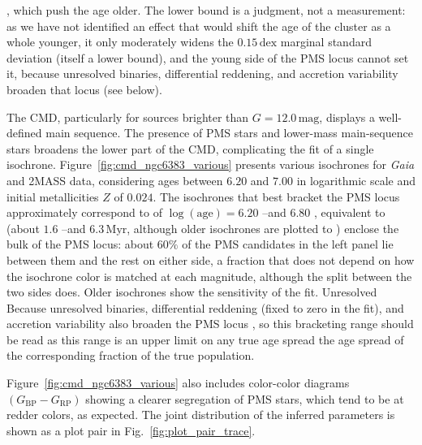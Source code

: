 \documentclass{aa}
\providecommand{\DIFaddtex}[1]{{\protect\color[rgb]{0,0,0.7}#1}} %
\providecommand{\DIFdeltex}[1]{{\protect\color[rgb]{0.65,0,0}\footnotesize #1}} %
\providecommand{\DIFaddbegin}{} %
\providecommand{\DIFaddend}{} %
\providecommand{\DIFdelbegin}{} %
\providecommand{\DIFdelend}{} %
\providecommand{\DIFadd}[1]{\texorpdfstring{\DIFaddtex{#1}}{#1}} %
\providecommand{\DIFdel}[1]{\texorpdfstring{\DIFdeltex{#1}}{}} %
\providecommand{\DIFscaledelfig}{0.5}
\newlength{\DIFdelgraphicswidth} %
\newlength{\DIFdelgraphicsheight} %
\providecommand{\DIFaddincludegraphics}[2][]{{\color{blue}\fbox{\DIFOincludegraphics[#1]{#2}}}} %
\providecommand{\DIFdelincludegraphics}[2][]{%
\sbox{\DIFdelgraphicsbox}{\DIFOincludegraphics[#1]{#2}}%
\settoboxwidth{\DIFdelgraphicswidth}{\DIFdelgraphicsbox} %
\settoboxtotalheight{\DIFdelgraphicsheight}{\DIFdelgraphicsbox} %
\scalebox{\DIFscaledelfig}{%
\parbox[b]{\DIFdelgraphicswidth}{\usebox{\DIFdelgraphicsbox}\\[-\baselineskip] \rule{\DIFdelgraphicswidth}{0em}}\llap{\resizebox{\DIFdelgraphicswidth}{\DIFdelgraphicsheight}{%
\setlength{\unitlength}{\DIFdelgraphicswidth}%
\begin{picture}(1,1)%
\thicklines\linethickness{2pt} %
{\color[rgb]{1,0,0}\put(0,0){\framebox(1,1){}}}%
{\color[rgb]{1,0,0}\put(0,0){\line( 1,1){1}}}%
{\color[rgb]{1,0,0}\put(0,1){\line(1,-1){1}}}%
\end{picture}%
}\hspace*{3pt}}} %
} %
\DeclareRobustCommand{\DIFaddbegin}{\DIFOaddbegin \let\includegraphics\DIFaddincludegraphics} %
\DeclareRobustCommand{\DIFaddend}{\DIFOaddend \let\includegraphics\DIFOincludegraphics} %
\DeclareRobustCommand{\DIFdelbegin}{\DIFOdelbegin \let\includegraphics\DIFdelincludegraphics} %
\DeclareRobustCommand{\DIFdelend}{\DIFOaddend \let\includegraphics\DIFOincludegraphics} %
\begin{document}
{}\DIFdelend \DIFaddbegin \DIFadd{, which push the age older. The lower bound is a judgment, not a measurement: as we have not identified an effect that would shift the age of the cluster as a whole younger, it only moderately widens the $0.15\,\mathrm{dex}$ marginal standard deviation (itself a lower bound), and the young side of the PMS locus cannot set it, because unresolved binaries, differential reddening, and accretion variability broaden that locus (see below).
}\DIFaddend 

The CMD, particularly for sources brighter than $G=12.0\,\mathrm{mag}$, displays a well-defined main sequence. The presence of PMS stars and lower-mass main-sequence stars broadens the lower part of the CMD, complicating the fit of a single isochrone. Figure~\ref{fig:cmd_ngc6383_various} presents various isochrones for \textit{Gaia} and 2MASS data, considering ages between $6.20$ and $7.00$ in logarithmic scale and initial metallicities $ Z $ of $0.024$. The isochrones \DIFdelbegin \DIFdel{that best bracket the PMS locus approximately correspond to }\DIFdelend \DIFaddbegin \DIFadd{of }\DIFaddend $\log(\mathrm{age})=6.20$ \DIFdelbegin \DIFdel{--}\DIFdelend \DIFaddbegin \DIFadd{and }\DIFaddend $6.80$ \DIFdelbegin \DIFdel{, equivalent to }\DIFdelend \DIFaddbegin \DIFadd{(}\DIFaddend about $1.6$ \DIFdelbegin \DIFdel{--}\DIFdelend \DIFaddbegin \DIFadd{and }\DIFaddend $6.3\,\mathrm{Myr}$\DIFdelbegin \DIFdel{, although older isochrones are plotted to }\DIFdelend \DIFaddbegin \DIFadd{) enclose the bulk of the PMS locus: about $60\%$ of the PMS candidates in the left panel lie between them and the rest on either side, a fraction that does not depend on how the isochrone color is matched at each magnitude, although the split between the two sides does. Older isochrones }\DIFaddend show the sensitivity of the fit. \DIFdelbegin \DIFdel{Unresolved }\DIFdelend \DIFaddbegin \DIFadd{Because unresolved }\DIFaddend binaries, differential reddening (fixed to zero in the fit), and accretion variability also broaden the \DIFdelbegin \DIFdel{PMS }\DIFdelend locus \citep{2010ApJ...723..166D}, \DIFdelbegin \DIFdel{so this bracketing range should be read as }\DIFdelend \DIFaddbegin \DIFadd{this range is }\DIFaddend an upper limit on \DIFdelbegin \DIFdel{any true age spread }\DIFdelend \DIFaddbegin \DIFadd{the age spread of the corresponding fraction of the true population}\DIFaddend .

Figure~\ref{fig:cmd_ngc6383_various} also includes color-color diagrams $(G_\mathrm{BP} - G_\mathrm{RP})$ showing a clearer segregation of PMS stars, which tend to be at redder colors, as expected. The joint distribution of the inferred parameters is shown as a plot pair in Fig.~\ref{fig:plot_pair_trace}.
\end{document}
